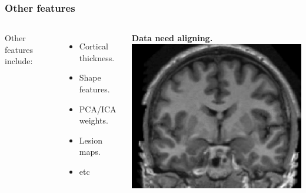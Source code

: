\begin{frame}
\frametitle{Other features}
\begin{columns}[c]
Other features include:
\begin{itemize}
\item Cortical thickness.
\item Shape features.
\item PCA/ICA weights.
\item Lesion maps.
\item etc
\end{itemize}
{\bf Data need aligning.}
\includegraphics[width=\textwidth]{brain-raw}
\end{columns}
\end{frame}

